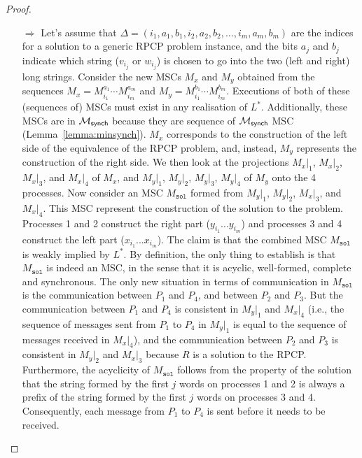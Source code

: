 \begin{proof}
	\begin{itemize}
		\item[$\Rightarrow$]
		      Let's assume that
		      $\Delta = (i_1, a_1, b_1, i_2, a_2, b_2, \ldots, i_m, a_m, b_m)$ are the indices
		      for a solution to a generic RPCP problem instance, and the bits $a_j$ and
		      $b_j$ indicate which string ($v_{i_j}$ or $w_{i_j}$) is chosen to go into
		      the two (left and right)
		      long strings. Consider the new MSCs $M_x$ and $M_y$ obtained from the sequences
		      $M_x = M^{a_1}_{i_1} \cdots M^{a_m}_{i_m}$ and $M_y = M^{b_1}_{i_1} \cdots M^{b_m}_{i_m}$.
		      Executions of both of these (sequences of) MSCs must exist in any
		      realisation of $L^*$. Additionally, these MSCs are in $\mathcal{M}_{\mathsf{synch}}$
		      because they are sequence of $\mathcal{M}_{\mathsf{synch}}$ MSC (Lemma~\ref{lemma:minsynch}).
		      $M_x$ corresponds to the construction of the left side of the equivalence of the RPCP
		      problem, and, instead, $M_y$ represents the construction of the right side.
		      We then look at the projections $M_x|_1$, $M_x|_2$, $M_x|_3$,
		      and $M_x|_4$ of $M_x$, and $M_y|_1$, $M_y|_2$, $M_y|_3$, $M_y|_4$ of $M_y$ onto the
		      4 processes. Now consider an MSC $M_{\texttt{sol}}$ formed from $M_y|_1$, $M_y|_2$,
		      $M_x|_3$, and $M_x|_4$. This MSC represent the construction of the solution to
		      the problem. Processes 1 and 2 construct the right part ($y_{i_1}...y_{i_m}$)
		      and processes 3 and 4 construct the left part ($x_{i_1}...x_{i_m}$).
		      The claim is that the combined MSC $M_{\texttt{sol}}$ is weakly
		      implied by $L^*$. By definition, the only thing to establish is that $M_{\texttt{sol}}$
		      is indeed an MSC, in the sense that it is acyclic, well-formed, complete
		      and synchronous.
		      The only new situation in terms of communication in $M_{\texttt{sol}}$ is the
		      communication between $P_1$ and $P_4$, and between $P_2$ and $P_3$.
		      But the communication between $P_1$ and $P_4$ is consistent in
		      $M_y|_1$ and $M_x|_4$ (i.e., the sequence of messages sent from $P_1$ to
		      $P_4$ in $M_y|_1$ is equal to the sequence of messages received in $M_x|_4$),
		      and the communication between $P_2$ and $P_3$ is consistent in
		      $M_y|_2$ and $M_x|_3$ because $R$ is a solution to the RPCP.
		      Furthermore, the acyclicity of $M_{\texttt{sol}}$ follows from the property of the
		      solution that the string formed by the first $j$ words on processes 1
		      and 2 is always a prefix of the string formed by the first $j$ words
		      on processes 3 and 4. Consequently, each message from $P_1$ to $P_4$
		      is sent before it needs to be received.


\end{itemize}
\end{proof}
